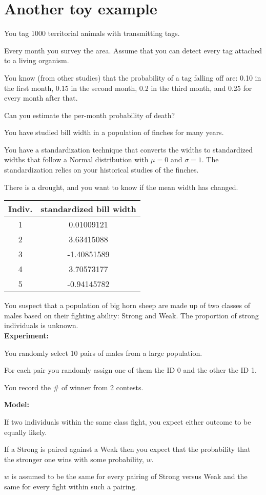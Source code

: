 \documentclass[landscape]{foils}
\begin{document}
\unitlength=1mm



\myNewSlide
\section*{Another toy example}
You tag 1000 territorial animals with transmitting tags.

Every month you survey the area.
Assume that you can detect every tag attached to a living organism.

You know (from other studies) that the probability of a tag falling off are:
0.10 in the first month, 0.15 in the second month, 0.2 in the third month, and
0.25 for every month after that.

Can you estimate the per-month probability of death?

\myNewSlide
You have studied bill width in a population of finches for many years. 

You have a standardization technique that converts the widths to standardized
widths that follow a Normal distribution with $\mu=0$ and $\sigma=1$. 
The standardization relies on your historical studies of the finches.

There is a drought, and you want to know if the mean width has changed.

\begin{center}
\begin{tabular}{c|c}
Indiv. & standardized bill width \\
\hline
1 & 0.01009121 \\
2 & 3.63415088 \\
3 &-1.40851589 \\
4 & 3.70573177 \\
5 &-0.94145782
\end{tabular}
\end{center}

\myNewSlide
You suspect that a population of big horn sheep are made up of two classes of males based on their fighting ability: Strong and Weak. The proportion of strong individuals is unknown.\\ {\bf Experiment:}
\begin{compactitem}
  \item You randomly select 10 pairs of males from a large population. 
  \item For each pair you randomly assign one of them the ID 0 and the other the ID 1.  
  \item You record the \# of winner from 2 contests.
\end{compactitem}
{\bf Model:}
\begin{compactitem}
  \item If two individuals within the same class fight, you expect either outcome to be equally likely.
  \item If a Strong is paired against a Weak then you expect that the probability that the stronger one wins with some probability, $w$.
  \item $w$ is assumed to be the same for every pairing of Strong {versus} Weak and the same for every fight within such a pairing.
\end{compactitem}
\end{document}
